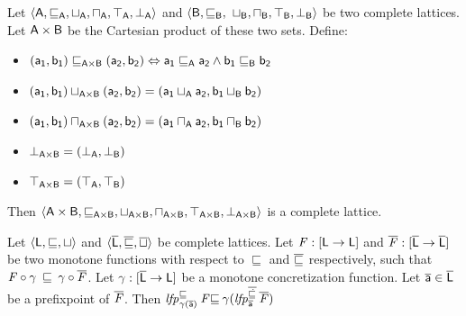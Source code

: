 \documentclass{llncs}
\begin{document}
\begin{theorem}
\label{theorem:cartesianproduct}
Let $\langle \mathsf{A}, \sqsubseteq_{\mathsf{A}}, \sqcup_{\mathsf{A}}, \sqcap_{\mathsf{A}}, \top_{\mathsf{A}}, \bot_{\mathsf{A}} \rangle$ and $\langle \mathsf{B}, \sqsubseteq_{\mathsf{B}},$ $\sqcup_{\mathsf{B}}, \sqcap_{\mathsf{B}}, \top_{\mathsf{B}}, \bot_{\mathsf{B}} \rangle$ be two complete lattices. Let $\mathsf{A} \times \mathsf{B}$ be the Cartesian product of these two sets. Define:
\begin{itemize}
\item $(\mathsf{a_1}, \mathsf{b_1}) \sqsubseteq_{\mathsf{A} \times \mathsf{B}} (\mathsf{a_2}, \mathsf{b_2}) \Leftrightarrow \mathsf{a_1} \sqsubseteq_{\mathsf{A}} \mathsf{a_2} \land \mathsf{b_1} \sqsubseteq_{\mathsf{B}} \mathsf{b_2}$
\item $(\mathsf{a_1}, \mathsf{b_1}) \sqcup_{\mathsf{A} \times \mathsf{B}} (\mathsf{a_2}, \mathsf{b_2}) = (\mathsf{a_1} \sqcup_{\mathsf{A}} \mathsf{a_2}, \mathsf{b_1} \sqcup_{\mathsf{B}} \mathsf{b_2})$
\item $(\mathsf{a_1}, \mathsf{b_1}) \sqcap_{\mathsf{A} \times \mathsf{B}} (\mathsf{a_2}, \mathsf{b_2}) = (\mathsf{a_1} \sqcap_{\mathsf{A}} \mathsf{a_2}, \mathsf{b_1} \sqcap_{\mathsf{B}} \mathsf{b_2})$
\item $\bot_{\mathsf{A} \times \mathsf{B}} = (\bot_{\mathsf{A}}, \bot_{\mathsf{B}})$
\item $\top_{\mathsf{A} \times \mathsf{B}} = (\top_{\mathsf{A}}, \top_{\mathsf{B}})$
\end{itemize}
Then $\langle \mathsf{A} \times \mathsf{B}, \sqsubseteq_{\mathsf{A} \times \mathsf{B}}, \sqcup_{\mathsf{A} \times \mathsf{B}}, \sqcap_{\mathsf{A} \times \mathsf{B}}, \top_{\mathsf{A} \times \mathsf{B}}, \bot_{\mathsf{A} \times \mathsf{B}} \rangle$ is a complete lattice.
\end{theorem}

\begin{theorem}
\label{theorem:kleene}
Let $\langle \mathsf{L}, \sqsubseteq, \sqcup \rangle$ and $\langle \mathsf{\overline{L}}, \overline{\mathit{\sqsubseteq}}, \overline{\mathit{\sqcup}} \rangle$ be complete lattices. Let $\mathit{F} : [\mathsf{L} \rightarrow\mathsf{L}]$ and $\overline{\mathit{F}} : [\mathsf{\overline{L}} \rightarrow\mathsf{\overline{L}}]$ be two monotone functions with respect to $\sqsubseteq$ and $\overline{\mathit{\sqsubseteq}}$ respectively, such that $\mathit{F} \circ \gamma \hspace{2pt} \sqsubseteq \hspace{2pt} \gamma \circ \overline{\mathit{F}}$. Let $\gamma : [\mathsf{\overline{L}} \rightarrow\mathsf{L}]$ be a monotone concretization function. Let $\mathsf{\overline{a}} \in \mathsf{\overline{L}}$ be a prefixpoint of $\overline{\mathit{F}}$. Then $\mathit{lfp}^{\mathit{\sqsubseteq}}_{\gamma(\mathsf{\overline{a}})} \hspace{2pt} \mathit{F} \mathit{\sqsubseteq} \hspace{2pt} \gamma(\mathit{lfp}^{\overline{\mathit{\dot{\sqsubseteq}}}}_{\mathsf{\overline{a}}} \hspace{2pt} \overline{\mathit{F}})$
\end{theorem}
\end{document}
